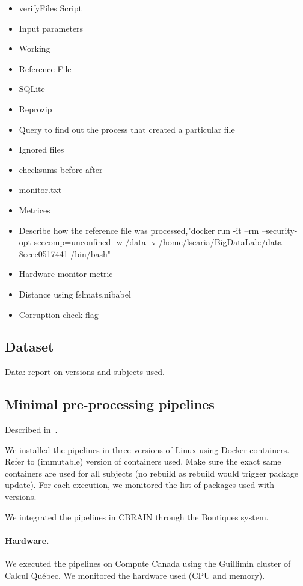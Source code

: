 \documentclass{article}
\begin{document}
\begin{itemize}
  \item{verifyFiles Script}
  \item{Input parameters}
  \item{Working}
  \item{Reference File}
  \item{SQLite}
  \item{Reprozip}
  \item{Query to find out the process that created a particular file}
  \item{Ignored files}
  \item{checksums-before-after}
  \item{monitor.txt}
  \item{Metrices}
  \item{Describe how the reference file was processed,"docker run -it --rm --security-opt seccomp=unconfined -w /data -v /home/lscaria/BigDataLab:/data 8eeec0517441 /bin/bash"}
  \item{Hardware-monitor metric}
  \item{Distance using fslmats,nibabel}
  \item{Corruption check flag}
\end{itemize}
\subsection{Dataset}

Data: report on versions and subjects used.

\subsection{Minimal pre-processing pipelines}

Described in~\cite{glasser2013minimal}.

We installed the pipelines in three versions of Linux using Docker
containers. Refer to (immutable) version of containers used. Make sure
the exact same containers are used for all subjects (no rebuild as
rebuild would trigger package update). For each execution, we
monitored the list of packages used with versions.

We integrated the pipelines in CBRAIN through the Boutiques system.

\paragraph{Hardware.} We executed the pipelines on Compute Canada
using the Guillimin cluster of Calcul Qu\'ebec. We monitored the
hardware used (CPU and memory). 
\end{document}
